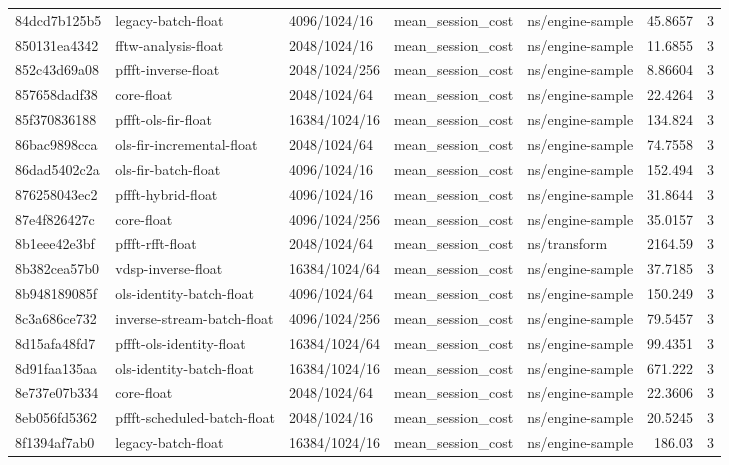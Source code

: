\begin{longtable}{lllllrr}
84dcd7b125b5 & legacy-batch-float & 4096/1024/16 & mean\_session\_cost & ns/engine-sample & 45.8657 & 3 \\
850131ea4342 & fftw-analysis-float & 2048/1024/16 & mean\_session\_cost & ns/engine-sample & 11.6855 & 3 \\
852c43d69a08 & pffft-inverse-float & 2048/1024/256 & mean\_session\_cost & ns/engine-sample & 8.86604 & 3 \\
857658dadf38 & core-float & 2048/1024/64 & mean\_session\_cost & ns/engine-sample & 22.4264 & 3 \\
85f370836188 & pffft-ols-fir-float & 16384/1024/16 & mean\_session\_cost & ns/engine-sample & 134.824 & 3 \\
86bac9898cca & ols-fir-incremental-float & 2048/1024/64 & mean\_session\_cost & ns/engine-sample & 74.7558 & 3 \\
86dad5402c2a & ols-fir-batch-float & 4096/1024/16 & mean\_session\_cost & ns/engine-sample & 152.494 & 3 \\
876258043ec2 & pffft-hybrid-float & 4096/1024/16 & mean\_session\_cost & ns/engine-sample & 31.8644 & 3 \\
87e4f826427c & core-float & 4096/1024/256 & mean\_session\_cost & ns/engine-sample & 35.0157 & 3 \\
8b1eee42e3bf & pffft-rfft-float & 2048/1024/64 & mean\_session\_cost & ns/transform & 2164.59 & 3 \\
8b382cea57b0 & vdsp-inverse-float & 16384/1024/64 & mean\_session\_cost & ns/engine-sample & 37.7185 & 3 \\
8b948189085f & ols-identity-batch-float & 4096/1024/64 & mean\_session\_cost & ns/engine-sample & 150.249 & 3 \\
8c3a686ce732 & inverse-stream-batch-float & 4096/1024/256 & mean\_session\_cost & ns/engine-sample & 79.5457 & 3 \\
8d15afa48fd7 & pffft-ols-identity-float & 16384/1024/64 & mean\_session\_cost & ns/engine-sample & 99.4351 & 3 \\
8d91faa135aa & ols-identity-batch-float & 16384/1024/16 & mean\_session\_cost & ns/engine-sample & 671.222 & 3 \\
8e737e07b334 & core-float & 2048/1024/64 & mean\_session\_cost & ns/engine-sample & 22.3606 & 3 \\
8eb056fd5362 & pffft-scheduled-batch-float & 2048/1024/16 & mean\_session\_cost & ns/engine-sample & 20.5245 & 3 \\
8f1394af7ab0 & legacy-batch-float & 16384/1024/16 & mean\_session\_cost & ns/engine-sample & 186.03 & 3 \\

\end{longtable}
